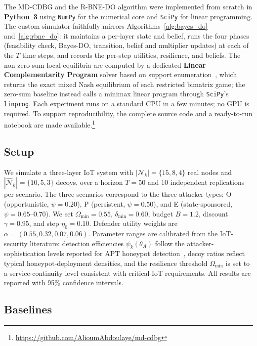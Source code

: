 \documentclass[conference]{IEEEtran}
\begin{document}
The MD-CDBG and the R-BNE-DO algorithm were implemented from scratch in
\textbf{Python~3} using \texttt{NumPy} for the numerical core and \texttt{SciPy}
for linear programming. The custom simulator faithfully mirrors
Algorithms~\ref{alg:bayes_do} and~\ref{alg:rbne_do}: it maintains a per-layer
state and belief, runs the four phases (feasibility check, Bayes-DO,
transition, belief and multiplier updates) at each of the $T$ time steps, and
records the per-step utilities, resilience, and beliefs. The non-zero-sum local
equilibria are computed by a dedicated \textbf{Linear Complementarity Program}
solver based on support enumeration~\cite{porter2008}, which returns the exact
mixed Nash equilibrium of each restricted bimatrix game; the zero-sum baseline
instead calls a minimax linear program through \texttt{SciPy}'s
\texttt{linprog}. Each experiment runs on a standard CPU in a few minutes; no
GPU is required. To support reproducibility, the complete source code and a
ready-to-run notebook are made available.\footnote{\url{https://github.com/AlioumAbdoulaye/md-cdbg}}

\subsection{Setup}
\label{sec:setup}

We simulate a three-layer IoT system with $|\mathcal{N}_k|=\{15,8,4\}$ real
nodes and $|\hat{\mathcal{N}}_k|=\{10,5,3\}$ decoys, over a horizon $T=50$ and
$10$ independent replications per scenario. The three scenarios correspond to
the three attacker types: O (opportunistic, $\psi=0.20$), P (persistent,
$\psi=0.50$), and E (state-sponsored, $\psi=0.65$--$0.70$). We set
$\Omega_{\min}=0.55$, $\delta_{\min}=0.60$, budget $B=1.2$, discount
$\gamma=0.95$, and step $\eta_0=0.10$. Defender utility weights are
$\alpha=(0.55,0.32,0.07,0.06)$. Parameter ranges are calibrated from the
IoT-security literature: detection efficiencies $\psi_k(\theta_A)$ follow the
attacker-sophistication levels reported for APT honeypot
detection~\cite{wan2022}, decoy ratios reflect typical honeypot-deployment
densities, and the resilience threshold $\Omega_{\min}$ is set to a
service-continuity level consistent with critical-IoT requirements. All results
are reported with 95\% confidence intervals.

\subsection{Baselines}
\end{document}
